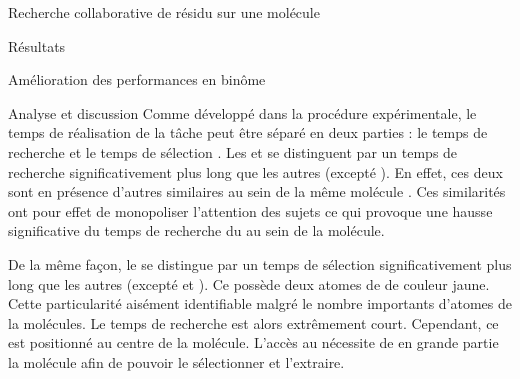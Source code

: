 \documentclass[myfrancais,ngerman,english,french]{mythesis}
\begin{document}
\begin{mychapter}{Recherche collaborative de résidu sur une molécule}
\begin{mysection}{Résultats}
\begin{mysubsection}{Amélioration des performances en binôme}
\begin{mysubsubsection}{Analyse et discussion}
					Comme développé dans la procédure expérimentale, le temps de réalisation de la tâche peut être séparé en deux parties : le temps de recherche et le temps de sélection .
					Les   et  se distinguent par un temps de recherche significativement plus long que les autres  (excepté ).
					En effet, ces deux  sont en présence d'autres  similaires au sein de la même molécule .
					Ces similarités ont pour effet de monopoliser l'attention des sujets ce qui provoque une hausse significative du temps de recherche du  au sein de la molécule.

					De la même façon, le   se distingue par un temps de sélection significativement plus long que les autres  (excepté  et ).
					Ce  possède deux atomes de  de couleur jaune.
					Cette particularité aisément identifiable malgré le nombre importants d'atomes de la molécules.
					Le temps de recherche est alors extrêmement court.
					Cependant, ce  est positionné au centre de la molécule.
					L'accès au  nécessite de  en grande partie la molécule afin de pouvoir le sélectionner et l'extraire.


\end{mysubsubsection}
\end{mysubsection}
\end{mysection}
\end{mychapter}
\end{document}
